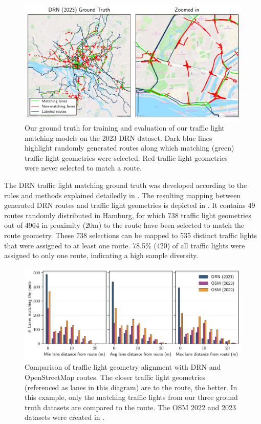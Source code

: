 \begin{figure}[t]
\centering 
\includegraphics[width=\linewidth]{images/matching-ground-truth-drn.pdf}
\caption{Our ground truth for training and evaluation of our traffic light matching models on the 2023 DRN dataset. Dark blue lines highlight randomly generated routes along which matching (green) traffic light geometries were selected. Red traffic light geometries were never selected to match a route.}
\label{fig:matching-ground-truth-drn}
\end{figure}

The DRN traffic light matching ground truth was developed according to the rules and methods explained detailedly in . The resulting mapping between generated DRN routes and traffic light geometries is depicted in . It contains 49 routes randomly distributed in Hamburg, for which 738 traffic light geometries out of 4964 in proximity (20m) to the route have been selected to match the route geometry. These 738 selections can be mapped to 535 distinct traffic lights that were assigned to at least one route. 78.5\% (420) of all traffic lights were assigned to only one route, indicating a high sample diversity.

\begin{figure}[t]
\centering 
\includegraphics[width=\linewidth]{images/routing-lane-alignment.pdf}
\caption{Comparison of traffic light geometry alignment with DRN and OpenStreetMap routes. The closer traffic light geometries (referenced as lanes in this diagram) are to the route, the better. In this example, only the matching traffic lights from our three ground truth datasets are compared to the route. The OSM 2022 and 2023 datasets were created in .}
\label{fig:routing-lane-alignment}
\end{figure}

